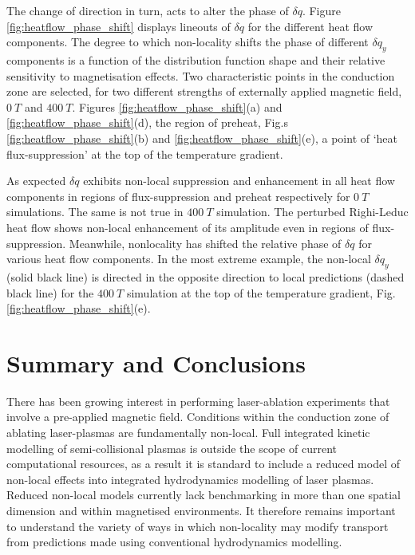 \documentclass[aip,reprint]{revtex4-1}
\begin{document}
The change of direction in turn, acts to alter the phase of $\delta q$. Figure \ref{fig:heatflow_phase_shift} displays lineouts of $\delta q$ for the different heat flow components. The degree to which non-locality shifts the phase of different $\delta q_y$ components is a function of the distribution function shape and their relative sensitivity to magnetisation effects.  Two characteristic points in the conduction zone are selected, for two different strengths of externally applied magnetic field, $\SI{0}{T}$ and $\SI{400}{T}$. Figures \ref{fig:heatflow_phase_shift}(a) and \ref{fig:heatflow_phase_shift}(d), the region of preheat, Fig.s \ref{fig:heatflow_phase_shift}(b) and \ref{fig:heatflow_phase_shift}(e), a point of `heat flux-suppression' at the top of the temperature gradient. 

As expected $\delta q$ exhibits non-local suppression and enhancement in all heat flow components in regions of flux-suppression and preheat respectively for $\SI{0}{T}$ simulations. The same is not true in $\SI{400}{T}$ simulation.  
The perturbed Righi-Leduc heat flow shows non-local enhancement of its amplitude even in regions of flux-suppression.  Meanwhile, nonlocality has shifted the relative phase of $\delta q$ for various heat flow components. In the most extreme example, the non-local $\delta q_y$ (solid black line) is directed in the opposite direction to local predictions (dashed black line) for the $\SI{400}{T}$ simulation at the top of the temperature gradient, Fig. \ref{fig:heatflow_phase_shift}(e).







\section{Summary and Conclusions}
There has been growing interest in performing laser-ablation experiments that involve a pre-applied magnetic field. Conditions within the conduction zone of ablating laser-plasmas are fundamentally non-local. Full integrated kinetic modelling of semi-collisional plasmas is outside the scope of current computational resources, as a result it is standard to include a reduced model of non-local effects into integrated hydrodynamics modelling of laser plasmas. Reduced non-local models currently lack benchmarking in more than one spatial dimension and within magnetised environments. It therefore remains important to understand the variety of ways in which non-locality may modify transport from predictions made using conventional hydrodynamics modelling.
\end{document}
